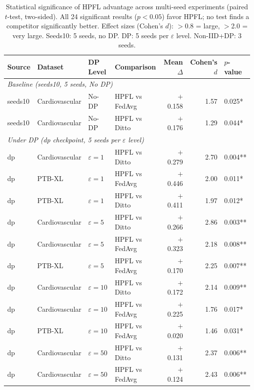 \documentclass[conference,a4paper]{IEEEtran}
\begin{document}
\begin{table}[htbp]
\centering
\caption{Statistical significance of HPFL advantage across multi-seed experiments (paired $t$-test, two-sided). All 24 significant results ($p{<}0.05$) favor HPFL; no test finds a competitor significantly better. Effect sizes (Cohen's $d$): $>$0.8 = large, $>$2.0 = very large. Seeds10: 5 seeds, no DP. DP: 5 seeds per $\varepsilon$ level. Non-IID+DP: 3 seeds.}
\label{tab:significance_extended}
\small
\begin{tabular}{llllrrl}
\toprule
\textbf{Source} & \textbf{Dataset} & \textbf{DP Level} & \textbf{Comparison} & \textbf{Mean $\Delta$} & \textbf{Cohen's $d$} & \textbf{$p$-value} \\
\midrule
\multicolumn{7}{l}{\textit{Baseline (seeds10, 5 seeds, No DP)}} \\
seeds10 & Cardiovascular & No-DP & HPFL vs FedAvg & $+$0.158 & 1.57 & 0.025* \\
seeds10 & Cardiovascular & No-DP & HPFL vs Ditto & $+$0.176 & 1.29 & 0.044* \\
\midrule
\multicolumn{7}{l}{\textit{Under DP (dp checkpoint, 5 seeds per $\varepsilon$ level)}} \\
dp & Cardiovascular & $\varepsilon{=}1$ & HPFL vs Ditto & $+$0.279 & 2.70 & 0.004** \\
dp & PTB-XL & $\varepsilon{=}1$ & HPFL vs FedAvg & $+$0.446 & 2.00 & 0.011* \\
dp & PTB-XL & $\varepsilon{=}1$ & HPFL vs Ditto & $+$0.411 & 1.97 & 0.012* \\
dp & Cardiovascular & $\varepsilon{=}5$ & HPFL vs Ditto & $+$0.266 & 2.86 & 0.003** \\
dp & Cardiovascular & $\varepsilon{=}5$ & HPFL vs FedAvg & $+$0.323 & 2.18 & 0.008** \\
dp & PTB-XL & $\varepsilon{=}5$ & HPFL vs FedAvg & $+$0.170 & 2.25 & 0.007** \\
dp & Cardiovascular & $\varepsilon{=}10$ & HPFL vs Ditto & $+$0.172 & 2.14 & 0.009** \\
dp & Cardiovascular & $\varepsilon{=}10$ & HPFL vs FedAvg & $+$0.225 & 1.76 & 0.017* \\
dp & PTB-XL & $\varepsilon{=}10$ & HPFL vs FedAvg & $+$0.020 & 1.46 & 0.031* \\
dp & Cardiovascular & $\varepsilon{=}50$ & HPFL vs Ditto & $+$0.131 & 2.37 & 0.006** \\
dp & Cardiovascular & $\varepsilon{=}50$ & HPFL vs FedAvg & $+$0.124 & 2.43 & 0.006** \\

\end{tabular}
\end{table}
\end{document}
